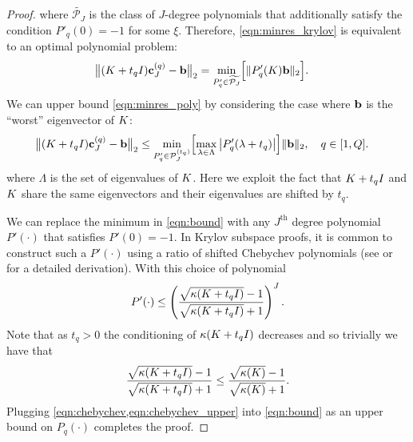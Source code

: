 \begin{proof}
  where $\widetilde{\mathcal{P}_J}$ is the class of $J$-degree polynomials that additionally satisfy the condition $P'_q(0) = -1$ for some $\xi$.
  Therefore, \cref{eqn:minres_krylov} is equivalent to an optimal polynomial problem:
	\begin{align}
    \bigl\Vert (K + t_q I) \mathbf{c}_J^{(q)} - \mathbf{b} \bigr\Vert_2
    &= \min_{P'_q \in \widetilde{\mathcal{P}_J}} \Bigl[
      \Vert P'_q(K) \mathbf{b} \Vert_2
    \Bigr].
    \label{eqn:minres_poly}
  \end{align}
  We can upper bound \cref{eqn:minres_poly} by considering the case where $\mathbf{b}$ is the ``worst'' eigenvector of $K$:
  \begin{align}
    \bigl\Vert (K + t_q I) \mathbf{c}_J^{(q)} - \mathbf{b} \bigr\Vert_2
    &\leq \min_{P'_q \in \mathcal{P}^{(t_q)}_J} \Bigl[
      \max_{\lambda \in \Lambda}
      \left\vert P'_q(\lambda + t_q) \right\vert
    \Bigr] \Vert \mathbf{b} \Vert_2,
    \quad
    q \in [1, Q].
    \label{eqn:bound}
	\end{align}
  where $\Lambda$ is the set of eigenvalues of $K$.
  Here we exploit the fact that $K + t_q I$ and $K$ share the same eigenvectors and their eigenvalues are shifted by $t_q$.

  We can replace the minimum in \cref{eqn:bound} with any $J^\text{th}$ degree polynomial $P'(\cdot)$ that satisfies $P'(0) = -1$.
  In Krylov subspace proofs, it is common to construct such a $P'(\cdot)$ using a ratio of shifted Chebychev polynomials (see \citep[e.g.][Sec. 9.2]{shewchuk1994introduction} or \citep[e.g.][Thm. 38.5]{trefethen1997numerical} for a detailed derivation).
  With this choice of polynomial
  \begin{equation}
    P'(\cdot)
    \leq \left( \frac{
      \sqrt{\kappa(K + t_q I)} - 1
    }{
      \sqrt{\kappa(K + t_q I)} + 1
    }\right)^J.
    \label{eqn:chebychev}
  \end{equation}
  Note that as $t_q > 0$ the conditioning of $\kappa(K + t_q I)$ decreases and so trivially we have that
  \begin{equation}
    \frac{
      \sqrt{\kappa(K + t_q I)} - 1
    }{
      \sqrt{\kappa(K + t_q I)} + 1
    }
    \leq
    \frac{
      \sqrt{\kappa(K)} - 1
    }{
      \sqrt{\kappa(K)} + 1
    }.
    \label{eqn:chebychev_upper}
  \end{equation}
  Plugging \cref{eqn:chebychev,eqn:chebychev_upper} into \cref{eqn:bound} as an upper bound on $P_q(\cdot)$ completes the proof.
\end{proof}


